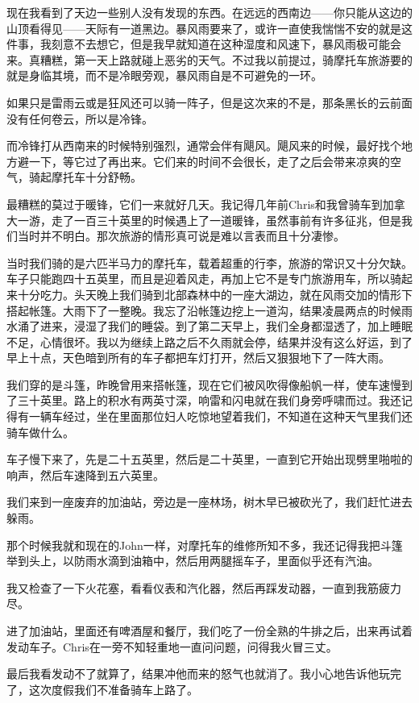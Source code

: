 \documentclass[UTF8]{article}
\begin{document}
\par 现在我看到了天边一些别人没有发现的东西。在远远的西南边——你只能从这边的山顶看得见——天际有一道黑边。暴风雨要来了，或许一直使我惴惴不安的就是这件事，我刻意不去想它，但是我早就知道在这种湿度和风速下，暴风雨极可能会来。真糟糕，第一天上路就碰上恶劣的天气。不过我以前提过，骑摩托车旅游要的就是身临其境，而不是冷眼旁观，暴风雨自是不可避免的一环。
\par 如果只是雷雨云或是狂风还可以骑一阵子，但是这次来的不是，那条黑长的云前面没有任何卷云，所以是冷锋。
\par 而冷锋打从西南来的时候特别强烈，通常会伴有飓风。飓风来的时候，最好找个地方避一下，等它过了再出来。它们来的时间不会很长，走了之后会带来凉爽的空气，骑起摩托车十分舒畅。
\par 最糟糕的莫过于暖锋，它们一来就好几天。我记得几年前Chris和我曾骑车到加拿大一游，走了一百三十英里的时候遇上了一道暖锋，虽然事前有许多征兆，但是我们当时并不明白。那次旅游的情形真可说是难以言表而且十分凄惨。
\par 当时我们骑的是六匹半马力的摩托车，载着超重的行李，旅游的常识又十分欠缺。车子只能跑四十五英里，而且是迎着风走，再加上它不是专门旅游用车，所以骑起来十分吃力。头天晚上我们骑到北部森林中的一座大湖边，就在风雨交加的情形下搭起帐篷。大雨下了一整晚。我忘了沿帐篷边挖上一道沟，结果凌晨两点的时候雨水涌了进来，浸湿了我们的睡袋。到了第二天早上，我们全身都湿透了，加上睡眠不足，心情很坏。我以为继续上路之后不久雨就会停，结果并没有这么好运，到了早上十点，天色暗到所有的车子都把车灯打开，然后又狠狠地下了一阵大雨。
\par 我们穿的是斗篷，昨晚曾用来搭帐篷，现在它们被风吹得像船帆一样，使车速慢到了三十英里。路上的积水有两英寸深，响雷和闪电就在我们身旁呼啸而过。我还记得有一辆车经过，坐在里面那位妇人吃惊地望着我们，不知道在这种天气里我们还骑车做什么。
\par 车子慢下来了，先是二十五英里，然后是二十英里，一直到它开始出现劈里啪啦的响声，然后车速降到五六英里。
\par 我们来到一座废弃的加油站，旁边是一座林场，树木早已被砍光了，我们赶忙进去躲雨。
\par 那个时候我就和现在的John一样，对摩托车的维修所知不多，我还记得我把斗篷举到头上，以防雨水滴到油箱中，然后用两腿摇车子，里面似乎还有汽油。
\par 我又检查了一下火花塞，看看仪表和汽化器，然后再踩发动器，一直到我筋疲力尽。
\par 进了加油站，里面还有啤酒屋和餐厅，我们吃了一份全熟的牛排之后，出来再试着发动车子。Chris在一旁不知轻重地一直问问题，问得我火冒三丈。
\par 最后我看发动不了就算了，结果冲他而来的怒气也就消了。我小心地告诉他玩完了，这次度假我们不准备骑车上路了。
\end{document}
